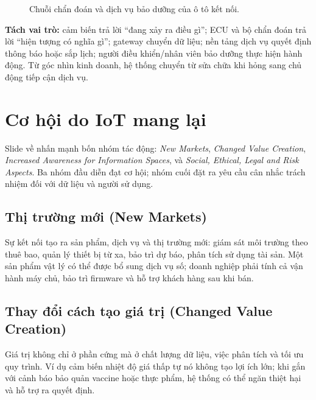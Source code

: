 \begin{figure}[H]\centering
{}\caption{Chuỗi chẩn đoán và dịch vụ bảo dưỡng của ô tô kết nối.}
\end{figure}

\textbf{Tách vai trò:} cảm biến trả lời ``đang xảy ra điều gì''; ECU và bộ chẩn đoán trả lời ``hiện tượng có nghĩa gì''; gateway chuyển dữ liệu; nền tảng dịch vụ quyết định thông báo hoặc sắp lịch; người điều khiển/nhân viên bảo dưỡng thực hiện hành động. Từ góc nhìn kinh doanh, hệ thống chuyển từ sửa chữa khi hỏng sang chủ động tiếp cận dịch vụ.

\section{Cơ hội do IoT mang lại}
Slide về  nhấn mạnh bốn nhóm tác động: \textit{New Markets}, \textit{Changed Value Creation}, \textit{Increased Awareness for Information Spaces}, và \textit{Social, Ethical, Legal and Risk Aspects}. Ba nhóm đầu diễn đạt cơ hội; nhóm cuối đặt ra yêu cầu cân nhắc trách nhiệm đối với dữ liệu và người sử dụng.

\subsection{Thị trường mới (New Markets)}
Sự kết nối tạo ra sản phẩm, dịch vụ và thị trường mới: giám sát môi trường theo thuê bao, quản lý thiết bị từ xa, bảo trì dự báo, phân tích sử dụng tài sản. Một sản phẩm vật lý có thể được bổ sung dịch vụ số; doanh nghiệp phải tính cả vận hành máy chủ, bảo trì firmware và hỗ trợ khách hàng sau khi bán.
\subsection{Thay đổi cách tạo giá trị (Changed Value Creation)}
Giá trị không chỉ ở phần cứng mà ở chất lượng dữ liệu, việc phân tích và tối ưu quy trình. Ví dụ cảm biến nhiệt độ giá thấp tự nó không tạo lợi ích lớn; khi gắn với cảnh báo bảo quản vaccine hoặc thực phẩm, hệ thống có thể ngăn thiệt hại và hỗ trợ ra quyết định.
